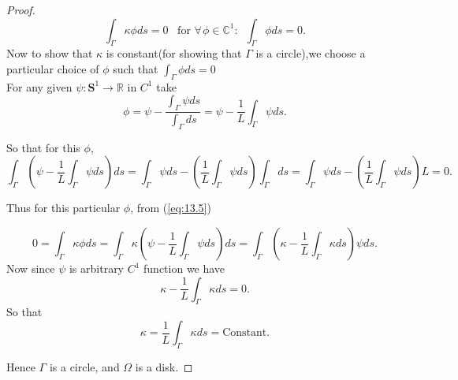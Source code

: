 \documentclass[oneside]{book}
\begin{document}
\begin{proof}
		
		\begin{equation}
			\label{eq:13.5}
			\int_{\Gamma} \kappa  \phi d s=0  \hspace{6pt}   \text{ for } \forall \hspace{1pt}  \phi \in \mathbb{C}^{1} : \hspace{6pt}         \int_{\Gamma} \phi d s=0.
		\end{equation}
		Now to show that $\kappa$ is constant(for showing that $\Gamma$ is a circle),we choose a\\ particular choice of $\phi$ such that $ \int_{\Gamma} \phi d s=0$
		\\
		
		For any given $\psi: \mathbf{S}^{1} \rightarrow \mathbb{R}$ in $C^{1}$ take $$\phi = \psi - \frac{\int_{\Gamma} \psi d s }{ \int_{\Gamma} d s}
		= \psi-\frac{1}{L} \int_{\Gamma} \psi d s.$$
		
		
		So that for this $\phi$, 
		$$\int_{\Gamma} \left(\psi-\frac{1}{L} \int_{\Gamma} \psi d s\right) d s = 
		\int_{\Gamma}\psi ds -  \left(\frac{1}{L} \int_{\Gamma} \psi d s\right)  \int_{\Gamma} d s  = \int_{\Gamma}\psi ds -  \left(\frac{1}{L} \int_{\Gamma} \psi ds \right)
		L  =  0.$$
		
		Thus for this particular $\phi$, from (\ref{eq:13.5})
		
		$$0 =  \int_{\Gamma} \kappa \phi d s = \int_{\Gamma} \kappa\left(\psi-\frac{1}{L} \int_{\Gamma} \psi d s\right) d s = \int_{\Gamma} \left(\kappa - \frac{1}{L} \int_{\Gamma} \kappa d s\right) \psi d s.$$
		Now since $\psi$ is arbitrary $C^{1}$ function we have 
		$$ \kappa - \frac{1}{L} \int_{\Gamma} \kappa d s = 0. $$
		So that
		$$\kappa =
		\frac{1}{L} \int_{\Gamma}\kappa  ds = \text{Constant}. $$
		
		Hence $\Gamma$ is a circle, and $\Omega$ is a disk.
		
		
		
	\end{proof} 
	
\end{document}
